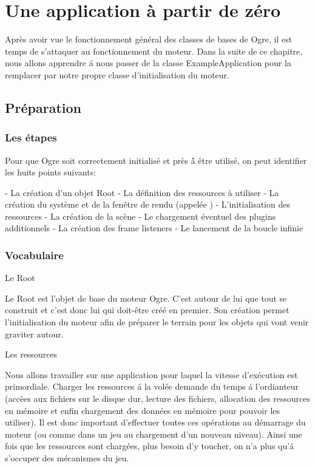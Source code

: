 
\chapter{Une application \`a partir de z\'ero}

Apr\`es avoir vue le fonctionnement g\'en\'eral des classes de bases de Ogre, il est temps de s'attaquer au fonctionnement du moteur. Dans la suite de ce chapitre, nous allons apprendre \'a nous passer de la classe ExampleApplication pour la remplacer par notre propre classe d'initialisation du moteur.

\section{Pr\'eparation}

\subsection{Les \'etapes}

Pour que Ogre soit correctement initialis\'e et pr\`es \'à \^etre utilis\'e, on peut identifier les huits points suivants:
\begin{itemize}
- La cr\'eation d'un objet Root
- La d\'efinition des ressources \`a utiliser
- La cr\'eation du syst\`eme et de la fen\^etre de rendu (appel\'ee )
- L'initialisation des ressources 
- La cr\'eation de la sc\`ene 
- Le chargement \'eventuel des plugins additionnels
- La cr\'eation des frame listeners
- Le lancement de la boucle infinie
\end{itemize}

\subsection{Vocabulaire}

Le Root

Le Root est l'objet de base du moteur Ogre. C'est autour de lui que tout se construit et c'est donc lui qui doit-\^etre cr\'e\'e en premier. Son cr\'eation permet l'initialisation du moteur afin de pr\'eparer le terrain pour les objets qui vont venir graviter autour.

Les ressources

Nous allons travailler sur une application pour laquel la vitesse d'ex\'ecution est primordiale. Charger les ressources \'a la vol\'ee demande du temps \'a l'ordianteur (acc\`ees aux fichiers sur le disque dur, lecture des fichiers, allocation des ressources en m\'emoire et enfin chargement des donn\'ees en m\'emoire pour pouvoir les utiliser). Il est donc important d'effectuer toutes ces op\'erations au d\'emarrage du moteur (ou comme dans un jeu au chargement d'un nouveau niveau). Ainsi une fois que les ressources sont charg\'ees, plus besoin d'y toucher, on n'a plus qu'\'a s'occuper des m\'ecanismes du jeu. 

